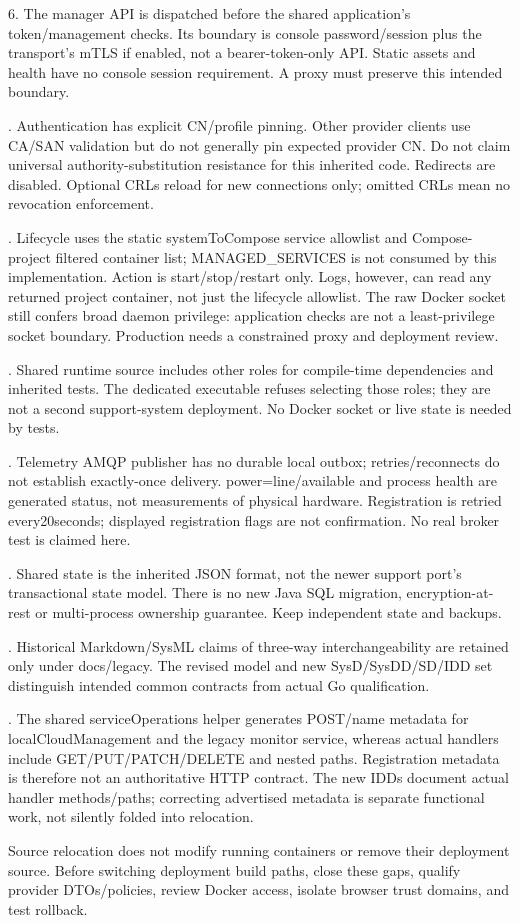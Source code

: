 \documentclass[a4paper]{arrowhead}
\begin{document}
6. The manager API is dispatched before the shared application's token/management checks. Its boundary is console password/session plus the transport's mTLS if enabled, not a bearer-token-only API. Static assets and health have no console session requirement. A proxy must preserve this intended boundary.\par{}. Authentication has explicit CN/profile pinning. Other provider clients use CA/SAN validation but do not generally pin expected provider CN. Do not claim universal authority-substitution resistance for this inherited code. Redirects are disabled. Optional CRLs reload for new connections only; omitted CRLs mean no revocation enforcement.\par{}. Lifecycle uses the static systemToCompose service allowlist and Compose-project filtered container list; MANAGED\_SERVICES is not consumed by this implementation. Action is start/stop/restart only. Logs, however, can read any returned project container, not just the lifecycle allowlist. The raw Docker socket still confers broad daemon privilege: application checks are not a least-privilege socket boundary. Production needs a constrained proxy and deployment review.\par{}. Shared runtime source includes other roles for compile-time dependencies and inherited tests. The dedicated executable refuses selecting those roles; they are not a second support-system deployment. No Docker socket or live state is needed by tests.\par{}. Telemetry AMQP publisher has no durable local outbox; retries/reconnects do not establish exactly-once delivery. power=line/available and process health are generated status, not measurements of physical hardware. Registration is retried every20seconds; displayed registration flags are not confirmation. No real broker test is claimed here.\par{}. Shared state is the inherited JSON format, not the newer support port's transactional state model. There is no new Java SQL migration, encryption-at-rest or multi-process ownership guarantee. Keep independent state and backups.\par{}. Historical Markdown/SysML claims of three-way interchangeability are retained only under docs/legacy. The revised model and new SysD/SysDD/SD/IDD set distinguish intended common contracts from actual Go qualification.\par{}. The shared serviceOperations helper generates POST/name metadata for localCloudManagement and the legacy monitor service, whereas actual handlers include GET/PUT/PATCH/DELETE and nested paths. Registration metadata is therefore not an authoritative HTTP contract. The new IDDs document actual handler methods/paths; correcting advertised metadata is separate functional work, not silently folded into relocation.\par\medskip
Source relocation does not modify running containers or remove their deployment source. Before switching deployment build paths, close these gaps, qualify provider DTOs/policies, review Docker access, isolate browser trust domains, and test rollback.\par\medskip
\end{document}
